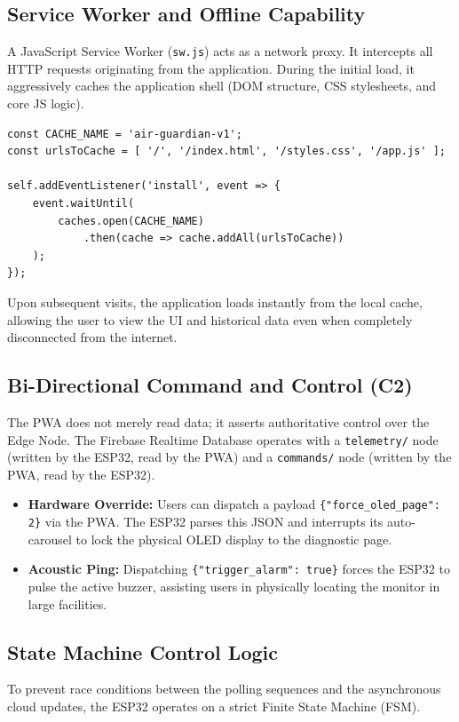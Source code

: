 \documentclass[12pt,journal,onecolumn,a4paper]{IEEEtran}
\begin{document}
\subsection{Service Worker and Offline Capability}
A JavaScript Service Worker (\texttt{sw.js}) acts as a network proxy. It intercepts all HTTP requests originating from the application. During the initial load, it aggressively caches the application shell (DOM structure, CSS stylesheets, and core JS logic). 
\begin{lstlisting}[caption=Service Worker Installation and Caching Logic]
const CACHE_NAME = 'air-guardian-v1';
const urlsToCache = [ '/', '/index.html', '/styles.css', '/app.js' ];

self.addEventListener('install', event => {
    event.waitUntil(
        caches.open(CACHE_NAME)
            .then(cache => cache.addAll(urlsToCache))
    );
});
\end{lstlisting}
Upon subsequent visits, the application loads instantly from the local cache, allowing the user to view the UI and historical data even when completely disconnected from the internet.

\subsection{Bi-Directional Command and Control (C2)}
The PWA does not merely read data; it asserts authoritative control over the Edge Node. 
The Firebase Realtime Database operates with a \texttt{telemetry/} node (written by the ESP32, read by the PWA) and a \texttt{commands/} node (written by the PWA, read by the ESP32).

\begin{itemize}
    \item \textbf{Hardware Override:} Users can dispatch a payload \texttt{\{"force\_oled\_page": 2\}} via the PWA. The ESP32 parses this JSON and interrupts its auto-carousel to lock the physical OLED display to the diagnostic page.
    \item \textbf{Acoustic Ping:} Dispatching \texttt{\{"trigger\_alarm": true\}} forces the ESP32 to pulse the active buzzer, assisting users in physically locating the monitor in large facilities.
\end{itemize}

\subsection{State Machine Control Logic}
To prevent race conditions between the polling sequences and the asynchronous cloud updates, the ESP32 operates on a strict Finite State Machine (FSM).
\end{document}
